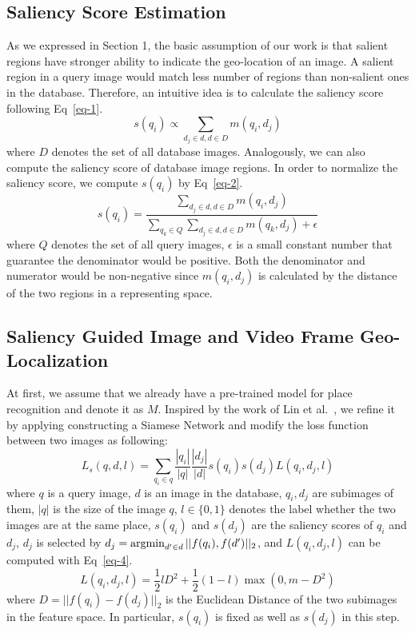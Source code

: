 \subsection{Saliency Score Estimation}
\par
As we expressed in Section 1, the basic assumption of our work is that salient regions have stronger ability to indicate the geo-location of an image. A salient region in a query image would match less number of regions than non-salient ones in the database. Therefore, an intuitive idea is to calculate the saliency score following Eq~\eqref{eq-1}.
\begin{equation}
s(q_i) \propto \sum_{d_j \in d, d \in D} m(q_i, d_j)
\label{eq-1}
\end{equation}
where $D$ denotes the set of all database images. Analogously, we can also compute the saliency score of database image regions. In order to normalize the saliency score, we compute $s(q_i)$ by Eq~\eqref{eq-2}.
\begin{equation}
s(q_i) = \frac{\sum_{d_j \in d, d \in D} m(q_i, d_j)}{\sum_{q_k \in Q}\sum_{d_j \in d, d \in D} m(q_k, d_j) + \epsilon}
\label{eq-2}
\end{equation}
where $Q$ denotes the set of all query images, $\epsilon$ is a small constant number that guarantee the denominator would be positive. Both the denominator and numerator would be non-negative since $m(q_i, d_j)$ is calculated by the distance of the two regions in a representing space. 
\subsection{Saliency Guided Image and Video Frame Geo-Localization}
\par
At first, we assume that we already have a pre-trained model for place recognition and denote it as $M$. Inspired by the work of Lin et al.~\cite{lin2015learning}, we refine it by applying constructing a Siamese Network and modify the loss function between two images as following:
\begin{equation}
\label{eq-3}
L_s(q,d,l) = \sum_{q_i\in q} \frac{|q_i|}{|q|}  \frac{|d_j|}{|d|} s(q_i)s(d_j)L(q_i, d_j, l)
\end{equation}
where $q$ is a query image, $d$ is an image in the database, $q_i, d_j$ are subimages of them, $|q|$ is the size of the image $q$, $l\in \{0,1\}$ denotes the label whether the two images are at the same place, $s(q_i)$ and $s(d_j)$ are the saliency scores of $q_i$ and $d_j$, $d_j$ is selected by $d_j = \operatorname*{argmin}_{{d'} \in d} ||f(q_i), f({d'})||_2 $, and $L(q_i, d_j, l)$ can be computed with Eq~\eqref{eq-4}.
\begin{equation}
\label{eq-4}
L(q_i, d_j, l)=\frac{1}{2}lD^2 + \frac{1}{2}(1-l)\max(0,m-D^2)
\end{equation}
where $D = ||f(q_i) - f(d_j)||_2$ is the Euclidean Distance of the two subimages in the feature space. In particular, $s(q_i)$ is fixed as well as $s(d_j)$ in this step. 
